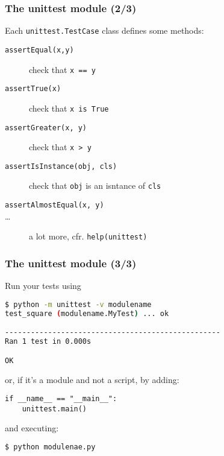 \documentclass[english,serif,mathserif,xcolor=pdftex,dvipsnames,table]{beamer}
\begin{document}
\begin{frame}[fragile]
  \frametitle{The unittest module (2/3)}

  Each \lstinline|unittest.TestCase| class defines some methods:
  \begin{description}
  \item [\texttt{assertEqual(x,y)}] check that \lstinline|x == y|
  \item[\texttt{assertTrue(x)}] check that \lstinline|x is True|
  \item[\texttt{assertGreater(x, y)}] check that \lstinline|x > y|
  \item[\texttt{assertIsInstance(obj, cls)}] check that
    \lstinline|obj| is an isntance of \lstinline|cls|
  \item[\texttt{assertAlmostEqual(x, y)}] 
  \item[\ldots] a lot more, cfr. \lstinline|help(unittest)|
  \end{description}

\end{frame}

\begin{frame}[fragile]
\frametitle{The unittest module (3/3)}
Run your tests using
\+
  \begin{lstlisting}[language=sh]
$ python -m unittest -v modulename
test_square (modulename.MyTest) ... ok

--------------------------------------------------
Ran 1 test in 0.000s

OK
\end{lstlisting}

or, if it's a module and not a script, by adding:
\begin{lstlisting}
if __name__ == "__main__":
    unittest.main()  
\end{lstlisting}
and executing:

\begin{lstlisting}[language=sh]
$ python modulenae.py
\end{lstlisting}%

\end{frame}
\end{document}
